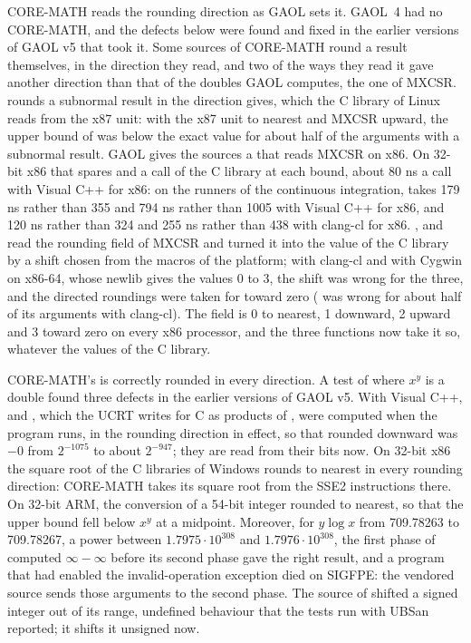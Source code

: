 \medskip
CORE-MATH reads the rounding direction as GAOL sets it.\newinvfive{} GAOL~4
had no CORE-MATH, and the defects below were found and fixed in the earlier
versions of GAOL v5 that took it. Some
sources of CORE-MATH round a result themselves, in the direction they read,
and two of the ways they read it gave another direction than that of the
doubles GAOL computes, the one of MXCSR.  rounds a subnormal
result in the direction  gives, which the C library of
Linux reads from the x87 unit: with the x87 unit to nearest and MXCSR upward,
the upper bound of  was below the exact value for about half of the
arguments with a subnormal result. GAOL gives the sources a
 that reads MXCSR on x86. On 32-bit x86 that spares
 and  a call of the C library at each bound, about
80 ns a call with Visual C++ for x86: on the runners of the continuous
integration,  takes 179 ns rather than 355 and
 794 ns rather than 1005 with Visual C++ for x86, and 120 ns
rather than 324 and 255 ns rather than 438 with clang-cl for x86.
,  and  read the rounding field of MXCSR
and turned it into the  value of the C library by a shift chosen
from the macros of the platform; with clang-cl and with Cygwin on x86-64,
whose newlib gives  the values 0 to 3, the shift was wrong for
the three, and the directed roundings were taken for toward zero
( was wrong for about half of its arguments with clang-cl). The
field is 0 to nearest, 1 downward, 2 upward and 3 toward zero on every x86
processor, and the three functions now take it so, whatever the values of
the C library.

\medskip
CORE-MATH's  is correctly rounded in every direction. A test of
 where $x^y$ is a double found three defects in the earlier
versions of GAOL v5. With Visual C++,
 and , which the UCRT writes for C as products of
, were computed when the program runs, in the rounding direction
in effect, so that  rounded downward was $-0$ from $2^{-1075}$ to
about $2^{-947}$; they are read from their bits now. On 32-bit x86 the square
root of the C libraries of Windows rounds to nearest in every rounding
direction: CORE-MATH takes its square root from the SSE2 instructions there.
On 32-bit ARM, the conversion of a 54-bit integer rounded to nearest, so that
the upper bound fell below $x^y$ at a midpoint. Moreover, for $y \log x$
from 709.78263 to 709.78267, a power between $1.7975 \cdot 10^{308}$ and
$1.7976 \cdot 10^{308}$, the first phase of  computed
$\infty - \infty$ before its second phase gave the right result, and a
program that had enabled the invalid-operation exception died on SIGFPE: the
vendored source sends those arguments to the second phase. The source of
 shifted a signed integer out of its range, undefined behaviour
that the tests run with UBSan reported; it shifts it unsigned now.

